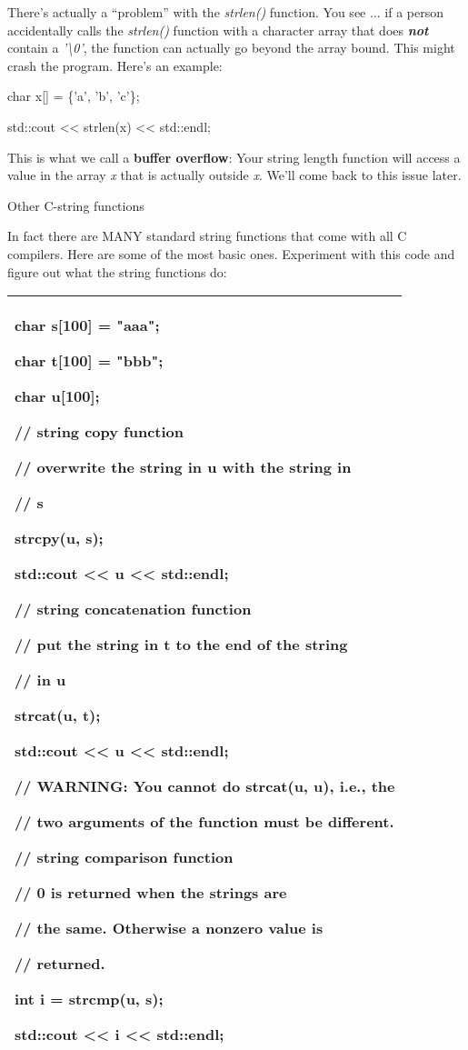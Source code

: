 \documentclass[
]{article}
\begin{document}
There's actually a ``problem'' with the \emph{strlen()} function. You
see ... if a person accidentally calls the \emph{strlen()} function with
a character array that does \emph{\textbf{not}} contain a
\emph{'\textbackslash0'}, the function can actually go beyond the array
bound. This might crash the program. Here's an example:

char x{[}{]} = \{'a', 'b', 'c'\};

std::cout \textless\textless{} strlen(x) \textless\textless{} std::endl;

This is what we call a \textbf{buffer overflow}: Your string length
function will access a value in the array \emph{x} that is actually
outside \emph{x}. We'll come back to this issue later.

Other C-string functions

In fact there are MANY standard string functions that come with all C
compilers. Here are some of the most basic ones. Experiment with this
code and figure out what the string functions do:

\begin{longtable}[]{@{}l@{}}
\toprule
\endhead
\begin{minipage}[t]{0.97\columnwidth}\raggedright
char s{[}100{]} = "aaa";

char t{[}100{]} = "bbb";

char u{[}100{]};

// string copy function

// overwrite the string in u with the string in

// s

strcpy(u, s);

std::cout \textless\textless{} u \textless\textless{} std::endl;

// string concatenation function

// put the string in t to the end of the string

// in u

strcat(u, t);

std::cout \textless\textless{} u \textless\textless{} std::endl;

// WARNING: You cannot do strcat(u, u), i.e., the

// two arguments of the function must be different.

// string comparison function

// 0 is returned when the strings are

// the same. Otherwise a nonzero value is

// returned.

int i = strcmp(u, s);

std::cout \textless\textless{} i \textless\textless{} std::endl;\strut
\end{minipage}\tabularnewline
\bottomrule
\end{longtable}
\end{document}
